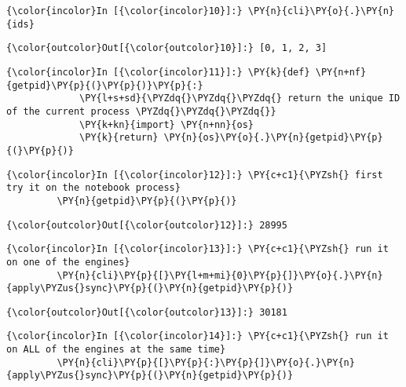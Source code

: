     \begin{Verbatim}[commandchars=\\\{\}]
{\color{incolor}In [{\color{incolor}10}]:} \PY{n}{cli}\PY{o}{.}\PY{n}{ids}
\end{Verbatim}

            \begin{Verbatim}[commandchars=\\\{\}]
{\color{outcolor}Out[{\color{outcolor}10}]:} [0, 1, 2, 3]
\end{Verbatim}
        


    \begin{Verbatim}[commandchars=\\\{\}]
{\color{incolor}In [{\color{incolor}11}]:} \PY{k}{def} \PY{n+nf}{getpid}\PY{p}{(}\PY{p}{)}\PY{p}{:}
             \PY{l+s+sd}{\PYZdq{}\PYZdq{}\PYZdq{} return the unique ID of the current process \PYZdq{}\PYZdq{}\PYZdq{}}
             \PY{k+kn}{import} \PY{n+nn}{os}
             \PY{k}{return} \PY{n}{os}\PY{o}{.}\PY{n}{getpid}\PY{p}{(}\PY{p}{)}
\end{Verbatim}

    \begin{Verbatim}[commandchars=\\\{\}]
{\color{incolor}In [{\color{incolor}12}]:} \PY{c+c1}{\PYZsh{} first try it on the notebook process}
         \PY{n}{getpid}\PY{p}{(}\PY{p}{)}
\end{Verbatim}

            \begin{Verbatim}[commandchars=\\\{\}]
{\color{outcolor}Out[{\color{outcolor}12}]:} 28995
\end{Verbatim}
        
    \begin{Verbatim}[commandchars=\\\{\}]
{\color{incolor}In [{\color{incolor}13}]:} \PY{c+c1}{\PYZsh{} run it on one of the engines}
         \PY{n}{cli}\PY{p}{[}\PY{l+m+mi}{0}\PY{p}{]}\PY{o}{.}\PY{n}{apply\PYZus{}sync}\PY{p}{(}\PY{n}{getpid}\PY{p}{)}
\end{Verbatim}

            \begin{Verbatim}[commandchars=\\\{\}]
{\color{outcolor}Out[{\color{outcolor}13}]:} 30181
\end{Verbatim}
        
    \begin{Verbatim}[commandchars=\\\{\}]
{\color{incolor}In [{\color{incolor}14}]:} \PY{c+c1}{\PYZsh{} run it on ALL of the engines at the same time}
         \PY{n}{cli}\PY{p}{[}\PY{p}{:}\PY{p}{]}\PY{o}{.}\PY{n}{apply\PYZus{}sync}\PY{p}{(}\PY{n}{getpid}\PY{p}{)}
\end{Verbatim}

